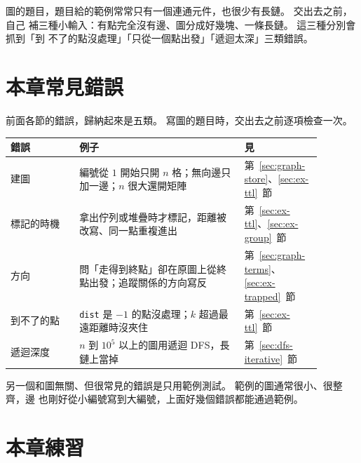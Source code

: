 \begin{apcsnote}
圖的題目，題目給的範例常常只有一個連通元件，也很少有長鏈。 交出去之前，自己
補三種小輸入：有點完全沒有邊、圖分成好幾塊、一條長鏈。 這三種分別會抓到「到
不了的點沒處理」「只從一個點出發」「遞迴太深」三類錯誤。
\end{apcsnote}

\section{本章常見錯誤}
\label{sec:graph-pitfalls}

前面各節的錯誤，歸納起來是五類。 寫圖的題目時，交出去之前逐項檢查一次。

\begin{center}
\begin{tabular}{p{0.2\linewidth}p{0.48\linewidth}p{0.2\linewidth}}
\toprule
錯誤 & 例子 & 見 \\
\midrule
建圖 & 編號從 $1$ 開始只開 $n$ 格；無向邊只加一邊；$n$ 很大還開矩陣 &
第~\ref{sec:graph-store}、\ref{sec:ex-ttl}~節 \\
標記的時機 & 拿出佇列或堆疊時才標記，距離被改寫、同一點重複進出 &
第~\ref{sec:ex-ttl}、\ref{sec:ex-group}~節 \\
方向 & 問「走得到終點」卻在原圖上從終點出發；追蹤關係的方向寫反 &
第~\ref{sec:graph-terms}、\ref{sec:ex-trapped}~節 \\
到不了的點 & \texttt{dist} 是 $-1$ 的點沒處理；$k$ 超過最遠距離時沒夾住 &
第~\ref{sec:ex-ttl}~節 \\
遞迴深度 & $n$ 到 $10^5$ 以上的圖用遞迴 DFS，長鏈上當掉 &
第~\ref{sec:dfs-iterative}~節 \\
\bottomrule
\end{tabular}
\end{center}

另一個和圖無關、但很常見的錯誤是只用範例測試。 範例的圖通常很小、很整齊，邊
也剛好從小編號寫到大編號，上面好幾個錯誤都能通過範例。

\section{本章練習}
\label{sec:ch11-exercises}

